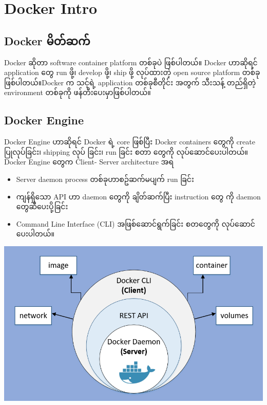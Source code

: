 \hypertarget{docker-intro}{%
\section{Docker Intro}\label{docker-intro}}

\hypertarget{docker-ux1019ux102dux1010ux103aux1006ux1000ux103a}{%
\subsection{Docker
မိတ်ဆက်}\label{docker-ux1019ux102dux1010ux103aux1006ux1000ux103a}}

Docker ဆိုတာ software container platform တစ်ခုပဲ ဖြစ်ပါတယ်။ Docker
ဟာဆိုရင် application ​တွေ run ဖို့၊ develop ဖို့၊ ship ဖို့ လုပ်ထားတဲ့
open source platform တစ်ခုဖြစ်ပါတယ်။Docker က သင့်ရဲ့ application
တစ်ခုစီတိုင်း အတွက် သီးသန့် တည်ရှိတဲ့ environment တစ်ခုကို
ဖန်တီး​ပေးမှာဖြစ်ပါတယ်။

\hypertarget{docker-engine}{%
\subsection{Docker Engine}\label{docker-engine}}

Docker Engine ဟာဆိုရင် Docker ရဲ့ core ဖြစ်ပြီး Docker containers
​တွေကို create ပြုလုပ်​ခြင်း၊ shipping လုပ် ခြင်း၊ run ခြင်း စတာ ​တွေကို
လုပ်​ဆောင်​ပေးပါတယ်။ Docker Engine ​တွေက Client- Server architecture အရ

\begin{itemize}
\tightlist
\item
  Server daemon process တစ်ခုဟာစဥ်ဆက်မပျက် run ခြင်း
\item
  ကျန်ရှိ​သော API ဟာ daemon ​တွေကို ချိတ်ဆက်ပြီး instruction ​တွေ ကို
  daemon ​တွေဆီ ​ပေးပို့ခြင်း
\item
  Command Line Interface (CLI) အဖြစ်​ဆောင်ရွက်ခြင်း စတ​တွေကို
  လုပ်​ဆောင်​ပေးပါတယ်။
\end{itemize}

\includegraphics{.gitbook/assets/screenshot-129.png}

